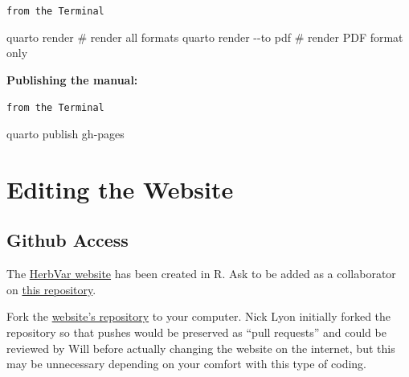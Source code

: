 \documentclass[
  letterpaper,
  DIV=11,
  numbers=noendperiod]{scrreprt}
\newenvironment{Shaded}{\begin{snugshade}}{\end{snugshade}}
\newcommand{\CommentTok}[1]{\textcolor[rgb]{0.37,0.37,0.37}{#1}}
\newcommand{\NormalTok}[1]{\textcolor[rgb]{0.00,0.23,0.31}{#1}}
\newcommand{\SpecialCharTok}[1]{\textcolor[rgb]{0.37,0.37,0.37}{#1}}
\begin{document}
\begin{codelisting}

\caption{\texttt{from the Terminal}}

\begin{Shaded}
\begin{Highlighting}[]

\NormalTok{quarto render           }\CommentTok{\# render all formats}
\NormalTok{quarto render }\SpecialCharTok{{-}{-}}\NormalTok{to pdf  }\CommentTok{\# render PDF format only}
\end{Highlighting}
\end{Shaded}

\end{codelisting}

\textbf{Publishing the manual:}

\begin{codelisting}

\caption{\texttt{from the Terminal}}

\begin{Shaded}
\begin{Highlighting}[]
\NormalTok{quarto publish gh}\SpecialCharTok{{-}}\NormalTok{pages}
\end{Highlighting}
\end{Shaded}

\end{codelisting}

\chapter{Editing the Website}\label{editing-the-website}

\section{Github Access}\label{github-access}

The \href{https://herbvar.org/index.html}{HerbVar website} has been
created in R. Ask to be added as a collaborator on
\href{https://github.com/HerbVar-Network/HerbVar-website}{this
repository}.

Fork the
\href{https://github.com/HerbVar-Network/HerbVar-website}{website's
repository} to your computer. Nick Lyon initially forked the repository
so that pushes would be preserved as ``pull requests'' and could be
reviewed by Will before actually changing the website on the internet,
but this may be unnecessary depending on your comfort with this type of
coding.
\end{document}
